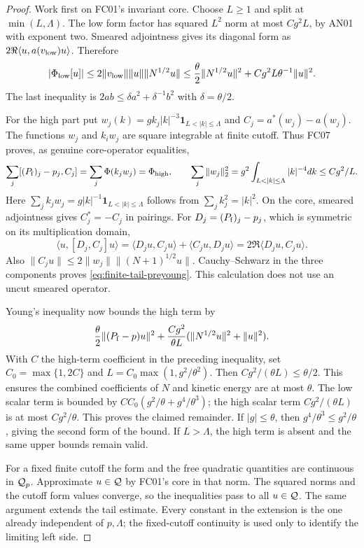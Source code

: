 \documentclass[11pt,a4paper]{article}
\theoremstyle{remark}\newtheorem{remark}[theorem]{Remark}
\begin{document}
\begin{proof}
Work first on FC01's invariant core. Choose $L\geq1$ and split at $\min(L,\Lambda)$. The low form factor has squared $L^2$ norm at most $Cg^2L$, by AN01 with exponent two. Smeared adjointness gives its diagonal form as $2\Re\langle u,a(v_{\rm low})u\rangle$. Therefore
\[
 |\Phi_{\rm low}[u]|
 \leq2\|v_{\rm low}\|\|u\|\|N^{1/2}u\|
 \leq\frac\theta2\|N^{1/2}u\|^2+Cg^2L\theta^{-1}\|u\|^2.
\]
The last inequality is $2ab\leq\delta a^2+\delta^{-1}b^2$ with $\delta=\theta/2$.

For the high part put
$w_j(k)=gk_j|k|^{-3}\mathbf1_{L<|k|\leq\Lambda}$ and
$C_j=a^*(w_j)-a(w_j)$. The functions $w_j$ and $k_iw_j$ are square integrable at finite cutoff. Thus FC07 proves, as genuine core-operator equalities,
\[
 \sum_j[(P_{\rm f})_j-p_j,C_j]
   =\sum_j\Phi(k_jw_j)=\Phi_{\rm high},
 \qquad \sum_j\|w_j\|_2^2
   =g^2\int_{L<|k|\leq\Lambda}|k|^{-4}dk\leq Cg^2/L.
\]
Here $\sum_jk_jw_j=g|k|^{-1}\mathbf1_{L<|k|\leq\Lambda}$ follows from $\sum_jk_j^2=|k|^2$. On the core, smeared adjointness gives $C_j^*=-C_j$ in pairings. For $D_j=(P_{\rm f})_j-p_j$, which is symmetric on its multiplication domain,
\[
 \langle u,[D_j,C_j]u\rangle
 =\langle D_ju,C_ju\rangle+\langle C_ju,D_ju\rangle
 =2\Re\langle D_ju,C_ju\rangle.
\]
Also $\|C_ju\|\leq2\|w_j\|\|(N+1)^{1/2}u\|$. Cauchy--Schwarz in the three components proves \eqref{eq:finite-tail-preyoung}. This calculation does not use an uncut smeared operator.

Young's inequality now bounds the high term by
\[
 \frac\theta2\|(P_{\rm f}-p)u\|^2
 +\frac{C g^2}{\theta L}(\|N^{1/2}u\|^2+\|u\|^2).
\]
With $C$ the high-term coefficient in the preceding inequality, set $C_0=\max\{1,2C\}$ and $L=C_0\max(1,g^2/\theta^2)$. Then $Cg^2/(\theta L)\leq\theta/2$. This ensures the combined coefficients of $N$ and kinetic energy are at most $\theta$. The low scalar term is bounded by
$CC_0(g^2/\theta+g^4/\theta^3)$; the high scalar term $Cg^2/(\theta L)$ is at most $Cg^2/\theta$. This proves the claimed remainder. If $|g|\leq\theta$, then $g^4/\theta^3\leq g^2/\theta$, giving the second form of the bound. If $L>\Lambda$, the high term is absent and the same upper bounds remain valid.

For a fixed finite cutoff the form and the free quadratic quantities are continuous in $\mathcal Q_p$. Approximate $u\in\mathcal Q$ by FC01's core in that norm. The squared norms and the cutoff form values converge, so the inequalities pass to all $u\in\mathcal Q$. The same argument extends the tail estimate. Every constant in the extension is the one already independent of $p,\Lambda$; the fixed-cutoff continuity is used only to identify the limiting left side.
\end{proof}
\end{document}
